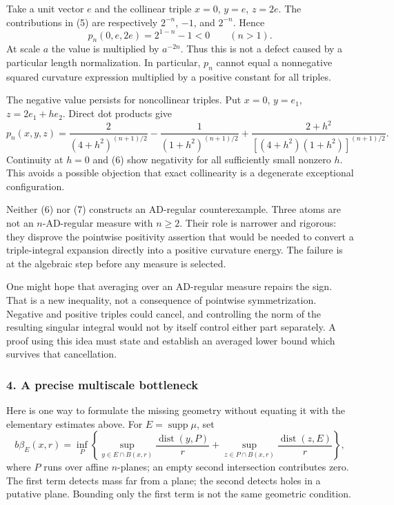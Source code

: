 \documentclass[11pt]{article}
\begin{document}
Take a unit vector $e$ and the collinear triple $x=0$, $y=e$, $z=2e$. The contributions in (5) are respectively $2^{-n}$, $-1$, and $2^{-n}$. Hence
\[
 p_n(0,e,2e)=2^{1-n}-1<0\qquad(n>1).       \tag{6}
\]
At scale $a$ the value is multiplied by $a^{-2n}$. Thus this is not a defect caused by a particular length normalization. In particular, $p_n$ cannot equal a nonnegative squared curvature expression multiplied by a positive constant for all triples.

The negative value persists for noncollinear triples. Put $x=0$, $y=e_1$, $z=2e_1+h e_2$. Direct dot products give
\[
 p_n(x,y,z)=\frac{2}{(4+h^2)^{(n+1)/2}}
 -\frac{1}{(1+h^2)^{(n+1)/2}}
 +\frac{2+h^2}{[(4+h^2)(1+h^2)]^{(n+1)/2}}.
                                                               \tag{7}
\]
Continuity at $h=0$ and (6) show negativity for all sufficiently small nonzero $h$. This avoids a possible objection that exact collinearity is a degenerate exceptional configuration.

Neither (6) nor (7) constructs an AD-regular counterexample. Three atoms are not an $n$-AD-regular measure with $n\geq2$. Their role is narrower and rigorous: they disprove the pointwise positivity assertion that would be needed to convert a triple-integral expansion directly into a positive curvature energy. The failure is at the algebraic step before any measure is selected.

One might hope that averaging over an AD-regular measure repairs the sign. That is a new inequality, not a consequence of pointwise symmetrization. Negative and positive triples could cancel, and controlling the norm of the resulting singular integral would not by itself control either part separately. A proof using this idea must state and establish an averaged lower bound which survives that cancellation.

\subsubsection{4. A precise multiscale bottleneck}
Here is one way to formulate the missing geometry without equating it with the elementary estimates above. For $E=\operatorname{supp}\mu$, set
\[
 b\beta_E(x,r)=\inf_P\left\{
 \sup_{y\in E\cap B(x,r)}\frac{\operatorname{dist}(y,P)}r
 +\sup_{z\in P\cap B(x,r)}\frac{\operatorname{dist}(z,E)}r
 \right\},                                                \tag{8}
\]
where $P$ runs over affine $n$-planes; an empty second intersection contributes zero. The first term detects mass far from a plane; the second detects holes in a putative plane. Bounding only the first term is not the same geometric condition.
\end{document}
